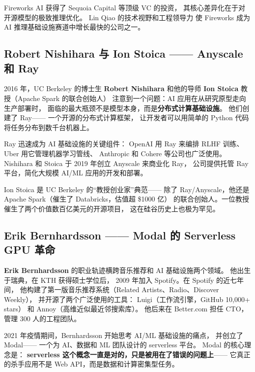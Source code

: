 Fireworks AI 获得了 Sequoia Capital 等顶级 VC 的投资，
其核心差异化在于对开源模型的极致推理优化。
Lin Qiao 的技术视野和工程领导力
使 Fireworks 成为 AI 推理基础设施赛道中增长最快的公司之一。

\subsection{Robert Nishihara 与 Ion Stoica —— Anyscale 和 Ray}
\label{subsec:anyscale}

2016 年，UC Berkeley 的博士生 \textbf{Robert Nishihara}
和他的导师 \textbf{Ion Stoica} 教授（Apache Spark 的联合创始人）
注意到一个问题：AI 应用在从研究原型走向生产部署时，
面临的最大瓶颈不是模型本身，而是\textbf{分布式计算基础设施}。
他们创建了 Ray——
一个开源的分布式计算框架，
让开发者可以用简单的 Python 代码将任务分布到数千台机器上。

Ray 迅速成为 AI 基础设施的关键组件：
OpenAI 用 Ray 来编排 RLHF 训练、
Uber 用它管理机器学习管线、
Anthropic 和 Cohere 等公司也广泛使用。
Nishihara 和 Stoica 于 2019 年创立 Anyscale 来商业化 Ray，
公司提供托管 Ray 平台，简化大规模 AI/ML 应用的开发和部署。

Ion Stoica 是 UC Berkeley 的``教授创业家''典范——
除了 Ray/Anyscale，他还是 Apache Spark（催生了 Databricks，估值超 \$1000 亿）
的联合创始人。一位教授催生了两个价值数百亿美元的开源项目，
这在硅谷历史上也极为罕见。

\subsection{Erik Bernhardsson —— Modal 的 Serverless GPU 革命}
\label{subsec:modal}

\textbf{Erik Bernhardsson} 的职业轨迹横跨音乐推荐和 AI 基础设施两个领域。
他出生于瑞典，在 KTH 获得硕士学位后，
2009 年加入 Spotify。在 Spotify 的近七年间，
他构建了第一版音乐推荐系统（Related Artists、Radio、Discover Weekly），
并开源了两个广泛使用的工具：
Luigi（工作流引擎，GitHub 10,000+ stars）
和 Annoy（高维近似最近邻搜索库）。
他后来在 Better.com 担任 CTO，管理 300 人的工程团队。

2021 年疫情期间，Bernhardsson 开始思考 AI/ML 基础设施的痛点，
并创立了 Modal——
一个为 AI、数据和 ML 团队设计的 serverless 平台。
Modal 的核心理念是：
\textbf{serverless 这个概念一直是对的，只是被用在了错误的问题上}——
它真正的杀手应用不是 Web API，而是数据和计算密集型任务。

